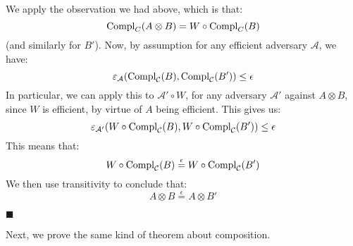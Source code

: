 \begin{lemma}
     We apply the observation we had above, which is that:
    $$
    \text{Compl}_{C}(A \otimes B) = W \circ \text{Compl}_C(B)
    $$
    (and similarly for $B'$). 
    Now, by assumption
    for any efficient adversary $\mathcal{A}$, we have:
    $$
    \varepsilon_{\mathcal{A}}(\text{Compl}_{\mathcal{C}}(B), \text{Compl}_{\mathcal{C}}(B')) \leq \epsilon
    $$
    In particular, we can apply this to $\mathcal{A}' \circ W$, for any
    adversary $\mathcal{A}'$ against $A \otimes B$,
    since $W$ is efficient, by virtue of $A$ being efficient.
    This gives us:
    $$
    \varepsilon_{\mathcal{A}'}(W \circ \text{Compl}_{\mathcal{C}}(B), W \circ \text{Compl}_{\mathcal{C}}(B')) \leq \epsilon
    $$
    This means that:
    $$
    W \circ \text{Compl}_{\mathcal{C}}(B) \overset{\epsilon}{=} W \circ \text{Compl}_{\mathcal{C}}(B')
    $$
    We then use transitivity to conclude that:
    $$
    A \otimes B \overset{\epsilon}{=} A \otimes B'
    $$

    $\blacksquare$
\end{lemma}

Next, we prove the same kind of theorem about composition.

